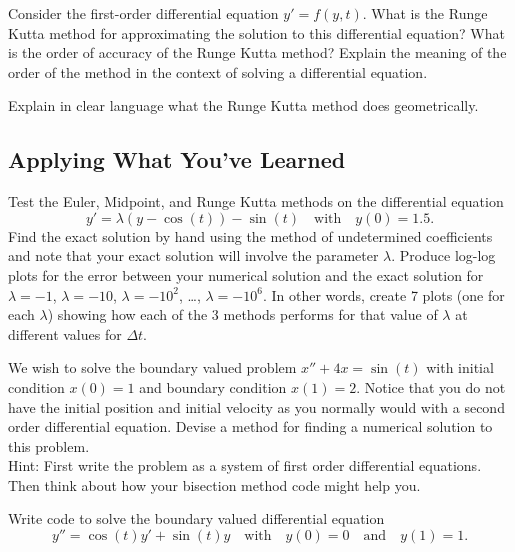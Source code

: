 \begin{problem}
    Consider the first-order differential equation $y' = f(y,t)$.  What is the Runge Kutta
    method for approximating the solution to this differential equation?  What is the
    order of accuracy of the Runge Kutta method?  Explain the meaning of the order of the
    method in the context of solving a differential equation.
\end{problem}

\begin{problem}
    Explain in clear language what the Runge Kutta method does geometrically.
\end{problem}

\subsection{Applying What You've Learned}
\begin{problem}
    Test the Euler, Midpoint, and Runge Kutta methods on the differential
    equation
    \[ y' = \lambda \left( y - \cos(t) \right) - \sin(t) \quad \text{with} \quad y(0) = 1.5. \]
    Find the exact solution by hand using the method of undetermined coefficients and note
    that your exact solution will involve the parameter $\lambda$.  Produce log-log plots
    for the error between your numerical solution and the exact solution for $\lambda =
    -1$, $\lambda = -10$, $\lambda = -10^2$, \ldots, $\lambda = -10^6$.  In other words,
    create 7 plots (one for each $\lambda$) showing how each of the 3 methods performs for
    that value of $\lambda$ at different values for $\Delta t$.
\end{problem}


\begin{problem}
    We wish to solve the boundary valued problem $x'' + 4x = \sin(t)$ with initial
    condition $x(0)=1$ and boundary condition $x(1)=2$.  Notice that you do not have the
    initial position and initial velocity as you normally would with a second order
    differential equation.  Devise a method for finding a numerical solution to this
    problem. \\
    Hint: First write the problem as a system of first order differential equations.  Then
    think about how your bisection method code might help you.
\end{problem}


\begin{problem}
    Write code to solve the boundary valued differential equation
    \[ y'' = \cos(t) y' + \sin(t) y \quad \text{with} \quad y(0) = 0 \quad \text{and}
        \quad y(1) = 1. \]
\end{problem}



